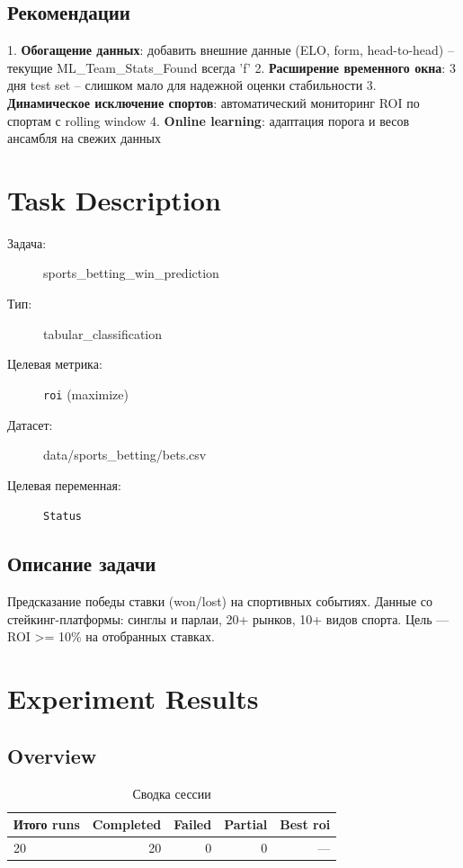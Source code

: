 \documentclass[12pt,a4paper]{article}
\begin{document}
\subsection{Рекомендации}
1. \textbf{Обогащение данных}: добавить внешние данные (ELO, form, head-to-head) -- текущие ML_Team_Stats_Found всегда 'f'
2. \textbf{Расширение временного окна}: 3 дня test set -- слишком мало для надежной оценки стабильности
3. \textbf{Динамическое исключение спортов}: автоматический мониторинг ROI по спортам с rolling window
4. \textbf{Online learning}: адаптация порога и весов ансамбля на свежих данных




\section{Task Description}

\begin{description}
    \item[Задача:] sports\_betting\_win\_prediction
    \item[Тип:] tabular\_classification
    \item[Целевая метрика:] \texttt{roi}
        (maximize)
    \item[Датасет:] data/sports\_betting/bets.csv
    \item[Целевая переменная:] \texttt{Status}
\end{description}

\subsection*{Описание задачи}
Предсказание победы ставки (won/lost) на спортивных событиях. Данные со стейкинг-платформы: синглы и парлаи, 20+ рынков, 10+ видов спорта. Цель — ROI >= 10\% на отобранных ставках.




\section{Experiment Results}

\subsection{Overview}

\begin{table}[H]
\centering
\caption{Сводка сессии}
\begin{tabular}{lrrrr}
\toprule
Итого runs & Completed & Failed & Partial & Best roi \\
\midrule
20 & \textcolor{passcolor}{20}
    & \textcolor{failcolor}{0}
    & \textcolor{partialcolor}{0}
    & --- \\
\bottomrule
\end{tabular}
\end{table}
\end{document}
